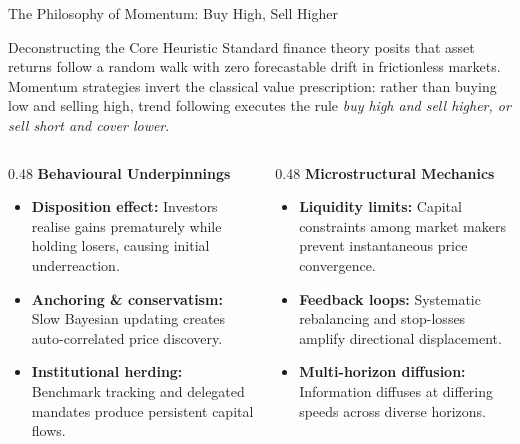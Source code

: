 \documentclass[10pt]{beamer}
\begin{document}
\begin{frame}{The Philosophy of Momentum: Buy High, Sell Higher}
  \begin{block}{Deconstructing the Core Heuristic}
    Standard finance theory posits that asset returns follow a random walk with zero forecastable drift in frictionless markets. Momentum strategies invert the classical value prescription: rather than buying low and selling high, trend following executes the rule \emph{buy high and sell higher, or sell short and cover lower}.
  \end{block}
  \vspace{0.1cm}
  \begin{columns}[t]
    \begin{column}{0.48\textwidth}
      \textbf{Behavioural Underpinnings}
      \begin{itemize}\scriptsize
        \item \textbf{Disposition effect:} Investors realise gains prematurely while holding losers, causing initial underreaction.
        \item \textbf{Anchoring \& conservatism:} Slow Bayesian updating creates auto-correlated price discovery.
        \item \textbf{Institutional herding:} Benchmark tracking and delegated mandates produce persistent capital flows.
      \end{itemize}
    \end{column}
    \begin{column}{0.48\textwidth}
      \textbf{Microstructural Mechanics}
      \begin{itemize}\scriptsize
        \item \textbf{Liquidity limits:} Capital constraints among market makers prevent instantaneous price convergence.
        \item \textbf{Feedback loops:} Systematic rebalancing and stop-losses amplify directional displacement.
        \item \textbf{Multi-horizon diffusion:} Information diffuses at differing speeds across diverse horizons.
      \end{itemize}
    \end{column}
  \end{columns}
\end{frame}
\end{document}
